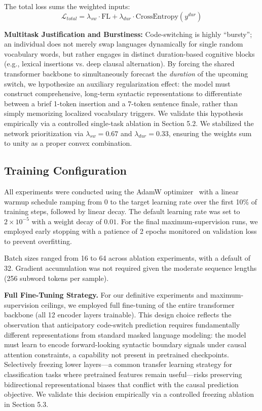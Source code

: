 \documentclass[sigconf,nonacm]{acmart}
\begin{document}
The total loss sums the weighted inputs:
\begin{equation}
    \mathcal{L}_{total} = \lambda_{sw} \cdot \text{FL} + \lambda_{dur} \cdot \text{CrossEntropy}(y^{dur})
\end{equation}

\textbf{Multitask Justification and Burstiness:}
Code-switching is highly ``bursty''; an individual does not merely swap languages dynamically for single random vocabulary words, but rather engages in distinct duration-based cognitive blocks (e.g., lexical insertions vs. deep clausal alternation). By forcing the shared transformer backbone to simultaneously forecast the \textit{duration} of the upcoming switch, we hypothesize an auxiliary regularization effect: the model must construct comprehensive, long-term syntactic representations to differentiate between a brief 1-token insertion and a 7-token sentence finale, rather than simply memorizing localized vocabulary triggers. We validate this hypothesis empirically via a controlled single-task ablation in Section 5.2. We stabilized the network prioritization via \(\lambda_{sw}=0.67\) and \(\lambda_{dur}=0.33\), ensuring the weights sum to unity as a proper convex combination.

\subsection{Training Configuration}
All experiments were conducted using the AdamW optimizer~\cite{conneau2020xlmr} with a linear warmup schedule ramping from 0 to the target learning rate over the first 10\% of training steps, followed by linear decay. The default learning rate was set to \(2 \times 10^{-5}\) with a weight decay of \(0.01\). For the final maximum-supervision runs, we employed early stopping with a patience of 2 epochs monitored on validation loss to prevent overfitting.

Batch sizes ranged from 16 to 64 across ablation experiments, with a default of 32. Gradient accumulation was not required given the moderate sequence lengths (256 subword tokens per sample).

\textbf{Full Fine-Tuning Strategy.}
For our definitive experiments and maximum-supervision ceilings, we employed full fine-tuning of the entire transformer backbone (all 12 encoder layers trainable). This design choice reflects the observation that anticipatory code-switch prediction requires fundamentally different representations from standard masked language modeling: the model must learn to encode forward-looking syntactic boundary signals under causal attention constraints, a capability not present in pretrained checkpoints. Selectively freezing lower layers---a common transfer learning strategy for classification tasks where pretrained features remain useful---risks preserving bidirectional representational biases that conflict with the causal prediction objective. We validate this decision empirically via a controlled freezing ablation in Section 5.3.
\end{document}
